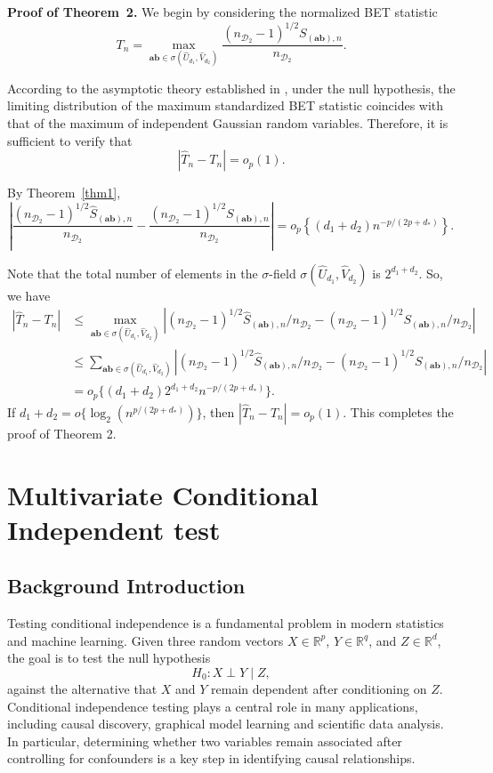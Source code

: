 \documentclass[12pt,reqno,oneside]{amsbook}
\theoremstyle{definition}
\theoremstyle{remark}
\begin{document}
\medskip
\textbf{Proof of Theorem~2.}
We begin by considering the normalized BET statistic
\[
T_n
=
\max_{\mathbf{ab}\in\sigma(\hat{U}_{d_1},\hat{V}_{d_2})}
\frac{(n_{\mathcal{D}_2}-1)^{1/2}S_{(\mathbf{ab}),n}}
{n_{\mathcal{D}_2}}.
\]

According to the asymptotic theory established in \cite{zhang2019bet}, under the null hypothesis, the limiting distribution of the maximum standardized BET statistic coincides with that of the maximum of independent Gaussian random variables. Therefore, it is sufficient to verify that
\[
|\hat{T}_n-T_n|
=
o_p(1).
\]

By Theorem~\ref{thm1},
\[
\left|
\frac{(n_{\mathcal{D}_2}-1)^{1/2}\hat{S}_{(\mathbf{ab}),n}}
{n_{\mathcal{D}_2}}
-
\frac{(n_{\mathcal{D}_2}-1)^{1/2}S_{(\mathbf{ab}),n}}
{n_{\mathcal{D}_2}}
\right|
=
o_p\!\left\{(d_1+d_2)n^{-p/(2p+d_*)}\right\}.
\]

Note that the total number of elements in the $\sigma$-field $\sigma(\hat{U}_{d_1}, \hat{V}_{d_2})$ is $2^{d_1+d_2}$.
So, we have
\begin{align*}  
|\hat{T}_{n}-T_{n} | &\leq \max_{\mathbf{ab}\in\sigma(\hat{U}_{d_1}, \hat{V}_{d_2})}|(n_{\mathcal{D}_2}-1)^{1/2}\hat{S}_{(\mathbf{a}\mathbf{b}),n}/n_{\mathcal{D}_2}-(n_{\mathcal{D}_2}-1)^{1/2}{S}_{(\mathbf{a}\mathbf{b}),n}/n_{\mathcal{D}_2}|\\
&\leq \sum_{\mathbf{ab}\in\sigma(\hat{U}_{d_1}, \hat{V}_{d_2})}|(n_{\mathcal{D}_2}-1)^{1/2}\hat{S}_{(\mathbf{a}\mathbf{b}),n}/n_{\mathcal{D}_2}-(n_{\mathcal{D}_2}-1)^{1/2}{S}_{(\mathbf{a}\mathbf{b}),n}/n_{\mathcal{D}_2}|\\
&=o_p\{(d_1+d_2)2^{d_1+d_2}n^{-p/(2p+d_*)}\}.
\end{align*}
If $d_1+d_2=o\{\log_2(n^{p/(2p+d_*)})\}$, then $|\hat{T}_{n}-T_{n} | = o_p(1)$. This completes the proof of Theorem 2. 
\chapter{Multivariate Conditional Independent test}

\section{Background Introduction}
\label{sec:mvcit_intro}

Testing conditional independence is a fundamental problem in modern statistics and machine learning. 
Given three random vectors $X \in \mathbb{R}^{p}$, $Y \in \mathbb{R}^{q}$, and 
$Z \in \mathbb{R}^{d}$, the goal is to test the null hypothesis
\[
H_0: X \perp Y \mid Z,
\]
against the alternative that $X$ and $Y$ remain dependent after conditioning on $Z$. 
Conditional independence testing plays a central role in many applications, 
including causal discovery, graphical model learning and 
scientific data analysis. In particular, determining whether two variables 
remain associated after controlling for confounders is a key step in 
identifying causal relationships.
\end{document}
